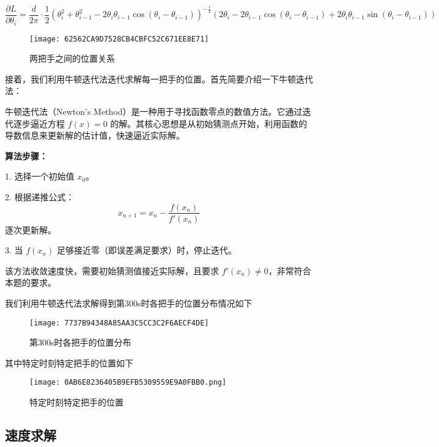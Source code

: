 \documentclass[withoutpreface,bwprint]{cumcmthesis} %
\newcommand{\tbf}[1]{\textbf{#1}}
\begin{document}
$$
\frac {\partial L} {\partial \theta_i} = \frac{d}{2\pi} \cdot \frac{1}{2} \left( \theta_i^2 + \theta_{i-1}^2 - 2\theta_i \theta_{i-1} \cos(\theta_i - \theta_{i-1}) \right)^{-\frac{1}{2}} \left( 2\theta_i - 2\theta_{i-1} \cos(\theta_i - \theta_{i-1}) + 2\theta_i \theta_{i-1} \sin(\theta_i - \theta_{i-1}) \right)
$$

\begin{figure}[h]  
    \centering
    \texttt{[image: 62562CA9D7528CB4CBFC52C671EE8E71]} %
    \caption{两把手之间的位置关系}
\end{figure}

接着，我们利用牛顿迭代法迭代求解每一把手的位置。首先简要介绍一下牛顿迭代法：

牛顿迭代法（Newton's Method）是一种用于寻找函数零点的数值方法。它通过迭代逐步逼近方程 \( f(x) = 0 \) 的解。其核心思想是从初始猜测点开始，利用函数的导数信息来更新解的估计值，快速逼近实际解。

\tbf{算法步骤：}

1. 选择一个初始值 \( x_0 \)。


2. 根据递推公式：
   \[
   x_{n+1} = x_n - \frac{f(x_n)}{f'(x_n)}
   \]
   逐次更新解。


3. 当 \( f(x_n) \) 足够接近零（即误差满足要求）时，停止迭代。

该方法收敛速度快，需要初始猜测值接近实际解，且要求 \( f'(x_n) \neq 0 \)，非常符合本题的要求。

我们利用牛顿迭代法求解得到第300s时各把手的位置分布情况如下

\begin{figure}[H]  
    \centering
    \texttt{[image: 7737B94348A85AA3C5CC3C2F6AECF4DE]} %
    \caption{第300s时各把手的位置分布}
\end{figure}

其中特定时刻特定把手的位置如下

\begin{figure}[H]  
    \centering
    \texttt{[image: 0AB6E8236405B9EFB5309559E9A0FBB0.png]} %
    \caption{特定时刻特定把手的位置}
\end{figure}

\subsection{速度求解}
\end{document}
